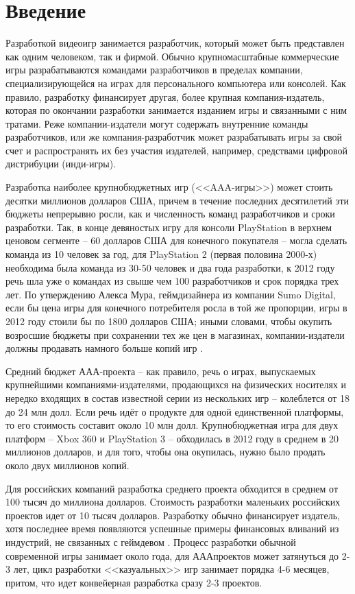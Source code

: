 \chapter{Введение}

Разработкой видеоигр занимается разработчик, который может быть представлен как одним человеком, так и
фирмой. Обычно крупномасштабные коммерческие игры разрабатываются командами разработчиков в пределах
компании, специализирующейся на играх для персонального компьютера или консолей. Как правило, разработку
финансирует другая, более крупная компания-издатель, которая по окончании разработки занимается изданием
игры и связанными с ним тратами. Реже компании-издатели могут содержать внутренние команды разработчиков,
или же компания-разработчик может разрабатывать игры за свой счет и распространять их без участия издателей,
например, средствами цифровой дистрибуции (инди-игры).

Разработка наиболее крупнобюджетных игр (<<AAA-игры>>) может стоить десятки миллионов долларов США, причем в
течение последних десятилетий эти бюджеты непрерывно росли, как и численность команд разработчиков и сроки
разработки. Так, в конце девяностых игру для консоли PlayStation в верхнем ценовом сегменте -- 60 долларов
США для конечного покупателя -- могла сделать команда из 10 человек за год, для PlayStation 2 (первая
половина 2000-х) необходима была команда из 30-50 человек и два года разработки, к 2012 году речь шла уже
о командах из свыше чем 100 разработчиков и срок порядка трех лет. По утверждению Алекса Мура, геймдизайнера
из компании Sumo Digital, если бы цена игры для конечного потребителя росла в той же пропорции, игры в 2012
году стоили бы по 1800 долларов США; иными словами, чтобы окупить возросшие бюджеты при сохранении тех же
цен в магазинах, компании-издатели должны продавать намного больше копий игр \cite{1.1}.

Средний бюджет ААА-проекта -- как правило, речь о играх, выпускаемых крупнейшими компаниями-издателями,
продающихся на физических носителях и нередко входящих в состав известной серии из нескольких игр --
колеблется от 18 до 24 млн долл. Если речь идёт о продукте для одной единственной платформы, то его
стоимость составит около 10 млн долл\cite{1.2}. Крупнобюджетная игра для двух платформ -- Xbox 360 и
PlayStation 3 -- обходилась в 2012 году в среднем в 20 миллионов долларов, и для того, чтобы она окупилась,
нужно было продать около двух миллионов копий\cite{1.3}.

Для российских компаний разработка среднего проекта обходится в среднем от 100 тысяч до миллиона долларов.
Стоимость разработки маленьких российских проектов идет от 10 тысяч долларов\cite{1.4}. Разработку обычно
финансирует издатель, хотя последнее время появляются успешные примеры финансовых вливаний из индустрий,
не связанных с геймдевом \cite{1.6}. Процесс разработки обычной современной игры занимает около года, 
для АААпроектов может затянуться до 2-3 лет, цикл разработки <<казуальных>> игр занимает порядка 4-6 
месяцев, притом, что идет конвейерная разработка сразу 2-3 проектов.

